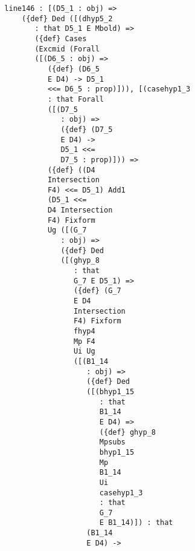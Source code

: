 \documentclass[12pt]{article}
\begin{document}
\begin{verbatim}
                     line146 : [(D5_1 : obj) => 
                         ({def} Ded ([(dhyp5_2 
                            : that D5_1 E Mbold) => 
                            ({def} Cases 
                            (Excmid (Forall 
                            ([(D6_5 : obj) => 
                               ({def} (D6_5 
                               E D4) -> D5_1 
                               <<= D6_5 : prop)])), [(casehyp1_3 
                               : that Forall 
                               ([(D7_5 
                                  : obj) => 
                                  ({def} (D7_5 
                                  E D4) -> 
                                  D5_1 <<= 
                                  D7_5 : prop)])) => 
                               ({def} ((D4 
                               Intersection 
                               F4) <<= D5_1) Add1 
                               (D5_1 <<= 
                               D4 Intersection 
                               F4) Fixform 
                               Ug ([(G_7 
                                  : obj) => 
                                  ({def} Ded 
                                  ([(ghyp_8 
                                     : that 
                                     G_7 E D5_1) => 
                                     ({def} (G_7 
                                     E D4 
                                     Intersection 
                                     F4) Fixform 
                                     fhyp4 
                                     Mp F4 
                                     Ui Ug 
                                     ([(B1_14 
                                        : obj) => 
                                        ({def} Ded 
                                        ([(bhyp1_15 
                                           : that 
                                           B1_14 
                                           E D4) => 
                                           ({def} ghyp_8 
                                           Mpsubs 
                                           bhyp1_15 
                                           Mp 
                                           B1_14 
                                           Ui 
                                           casehyp1_3 
                                           : that 
                                           G_7 
                                           E B1_14)]) : that 
                                        (B1_14 
                                        E D4) -> 

\end{verbatim}
\end{document}
